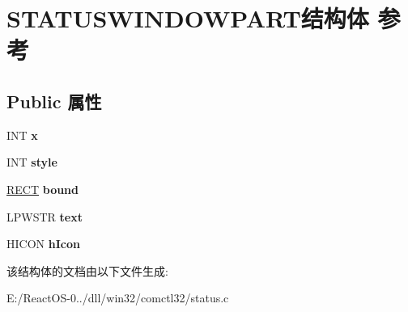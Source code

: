 \hypertarget{struct_s_t_a_t_u_s_w_i_n_d_o_w_p_a_r_t}{}\section{S\+T\+A\+T\+U\+S\+W\+I\+N\+D\+O\+W\+P\+A\+R\+T结构体 参考}
\label{struct_s_t_a_t_u_s_w_i_n_d_o_w_p_a_r_t}
\subsection*{Public 属性}
\begin{DoxyCompactItemize}
\item 
\mbox{\label{struct_s_t_a_t_u_s_w_i_n_d_o_w_p_a_r_t_aecc6b299b2e57c0d18ce21be3f74d422}} 
I\+NT {\bfseries x}
\item 
\mbox{\label{struct_s_t_a_t_u_s_w_i_n_d_o_w_p_a_r_t_a8dceb0f999f2a7cfa5fd17df9cb1b8e9}} 
I\+NT {\bfseries style}
\item 
\mbox{\label{struct_s_t_a_t_u_s_w_i_n_d_o_w_p_a_r_t_a30fed07044a17b0576a24de33bc9fce9}} 
\hyperlink{structtag_r_e_c_t}{R\+E\+CT} {\bfseries bound}
\item 
\mbox{\label{struct_s_t_a_t_u_s_w_i_n_d_o_w_p_a_r_t_aadad07aa7886fb86ab249b55ea29452e}} 
L\+P\+W\+S\+TR {\bfseries text}
\item 
\mbox{\label{struct_s_t_a_t_u_s_w_i_n_d_o_w_p_a_r_t_afd0c3f5733da9ae6b0f8fdae823c7f40}} 
H\+I\+C\+ON {\bfseries h\+Icon}
\end{DoxyCompactItemize}


该结构体的文档由以下文件生成\+:\begin{DoxyCompactItemize}
\item 
E\+:/\+React\+O\+S-\/0../dll/win32/comctl32/status.\+c\end{DoxyCompactItemize}
